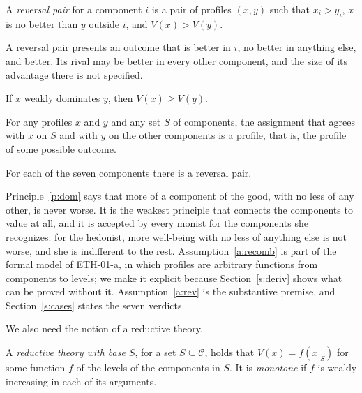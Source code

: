 \documentclass{situationist-preprint}
\begin{document}
\begin{definition}\label{d:reversal}
A \emph{reversal pair} for a component $i$ is a pair of profiles $(x, y)$ such that $x_i > y_i$, $x$ is no better than $y$ outside $i$, and $V(x) > V(y)$.
\end{definition}

A reversal pair presents an outcome that is better in $i$, no better in anything else, and better. Its rival may be better in every other component, and the size of its advantage there is not specified.

\begin{principle}[Dominance]\label{p:dom}
If $x$ weakly dominates $y$, then $V(x) \geq V(y)$.
\end{principle}

\begin{assumption}[Recombination]\label{a:recomb}
For any profiles $x$ and $y$ and any set $S$ of components, the assignment that agrees with $x$ on $S$ and with $y$ on the other components is a profile, that is, the profile of some possible outcome.
\end{assumption}

\begin{assumption}\label{a:rev}
For each of the seven components there is a reversal pair.
\end{assumption}

Principle~\ref{p:dom} says that more of a component of the good, with no less of any other, is never worse. It is the weakest principle that connects the components to value at all, and it is accepted by every monist for the components she recognizes: for the hedonist, more well-being with no less of anything else is not worse, and she is indifferent to the rest. Assumption~\ref{a:recomb} is part of the formal model of ETH-01-a, in which profiles are arbitrary functions from components to levels; we make it explicit because Section~\ref{s:deriv} shows what can be proved without it. Assumption~\ref{a:rev} is the substantive premise, and Section~\ref{s:cases} states the seven verdicts.

We also need the notion of a reductive theory.

\begin{definition}\label{d:reductive}
A \emph{reductive theory with base $S$}, for a set $S \subseteq \mathcal{C}$, holds that $V(x) = f(x|_S)$ for some function $f$ of the levels of the components in $S$. It is \emph{monotone} if $f$ is weakly increasing in each of its arguments.
\end{definition}
\end{document}
